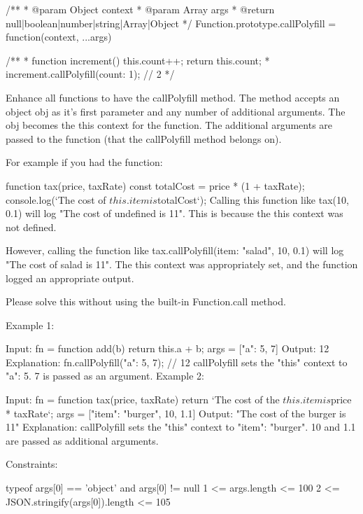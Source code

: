 /**
 * @param {Object} context
 * @param {Array} args
 * @return {null|boolean|number|string|Array|Object}
 */
Function.prototype.callPolyfill = function(context, ...args) {
	
}

/**
 * function increment() { this.count++; return this.count; }
 * increment.callPolyfill({count: 1}); // 2
 */



Enhance all functions to have the callPolyfill method. The method accepts an object obj as it's first parameter and any number of additional arguments. The obj becomes the this context for the function. The additional arguments are passed to the function (that the callPolyfill method belongs on).

For example if you had the function:

function tax(price, taxRate) {
  const totalCost = price * (1 + taxRate);
  console.log(`The cost of ${this.item} is ${totalCost}`);
}
Calling this function like tax(10, 0.1) will log "The cost of undefined is 11". This is because the this context was not defined.

However, calling the function like tax.callPolyfill({item: "salad"}, 10, 0.1) will log "The cost of salad is 11". The this context was appropriately set, and the function logged an appropriate output.

Please solve this without using the built-in Function.call method.

 

Example 1:

Input:
fn = function add(b) {
  return this.a + b;
}
args = [{"a": 5}, 7]
Output: 12
Explanation:
fn.callPolyfill({"a": 5}, 7); // 12
callPolyfill sets the "this" context to {"a": 5}. 7 is passed as an argument.
Example 2:

Input: 
fn = function tax(price, taxRate) { 
 return `The cost of the ${this.item} is ${price * taxRate}`; 
}
args = [{"item": "burger"}, 10, 1.1]
Output: "The cost of the burger is 11"
Explanation: callPolyfill sets the "this" context to {"item": "burger"}. 10 and 1.1 are passed as additional arguments.
 

Constraints:

typeof args[0] == 'object' and args[0] != null
1 <= args.length <= 100
2 <= JSON.stringify(args[0]).length <= 105